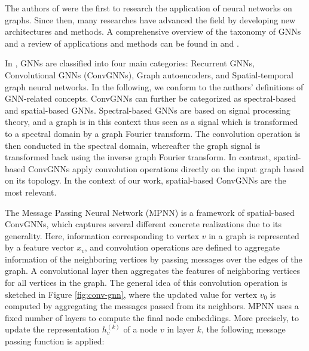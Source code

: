 \documentclass[draft,final]{vutinfth} %
\begin{document}
The authors of \cite{Sperduti1997} were the first to research the application of neural networks on graphs. Since then, many researches have advanced the field by developing new architectures and methods. 
A comprehensive overview of the taxonomy of GNNs and a review of applications and methods can be found in \cite{Wu2019} and \cite{Zhou2020}. 

In \cite{Wu2019}, GNNs are classified into four main categories: Recurrent GNNs, Convolutional GNNs (ConvGNNs), Graph autoencoders, and Spatial-temporal graph neural networks. In the following, we conform to the authors' definitions of GNN-related concepts. 
ConvGNNs can further be categorized as spectral-based and spatial-based GNNs. Spectral-based GNNs are based on signal processing theory, and a graph is in this context thus seen as a signal which is transformed to a spectral domain by a graph Fourier transform. The convolution operation is then conducted in the spectral domain, whereafter the graph signal is transformed back using the inverse graph Fourier transform. 
In contrast, spatial-based ConvGNNs apply convolution operations directly on the input graph based on its topology. 
In the context of our work, spatial-based ConvGNNs are the most relevant. 


The Message Passing Neural Network (MPNN) \cite{GilmerSRVD17} is a framework of spatial-based ConvGNNs, which captures several different concrete realizations due to its generality. 
Here, information corresponding to vertex $v$ in a graph is represented by a feature vector $x_v$, and convolution operations are defined to aggregate information of the neighboring vertices by passing messages over the edges of the graph. A convolutional layer then aggregates the features of neighboring vertices for all vertices in the graph. The general idea of this convolution operation is sketched in Figure \ref{fig:conv-gnn}, 
where the updated value for vertex $v_0$ is computed by aggregating the messages passed from its neighbors. MPNN uses a fixed number of layers to compute the final node embeddings. 
More precisely, to update the representation $h_v^{(k)}$ of a node $v$ in layer $k$, the following message passing function is applied: 
\end{document}
